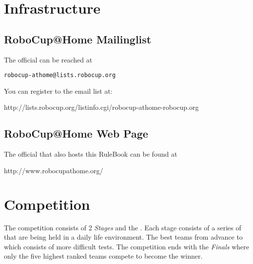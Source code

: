 \section{Infrastructure}
\label{sec:infrastructure}
\subsection{RoboCup@Home Mailinglist}
The official  can be reached at
\begin{center}
\texttt{robocup-athome@lists.robocup.org}
\end{center}
You can register to the email list at:
\begin{center}
http://lists.robocup.org/listinfo.cgi/robocup-athome-robocup.org
\end{center}

\subsection{RoboCup@Home Web Page}
The official  that also hosts this RuleBook can be found at \\
\begin{center}
http://www.robocupathome.org/
\end{center}


\section{Competition}
The competition consists of 2 \emph{Stages} and the . Each stage consists of a series of  that are being held in a daily life environment. The best teams from  advance to  which consists of more difficult tests. The competition ends with the \emph{Finals} where only the five highest ranked teams compete to become the winner.

